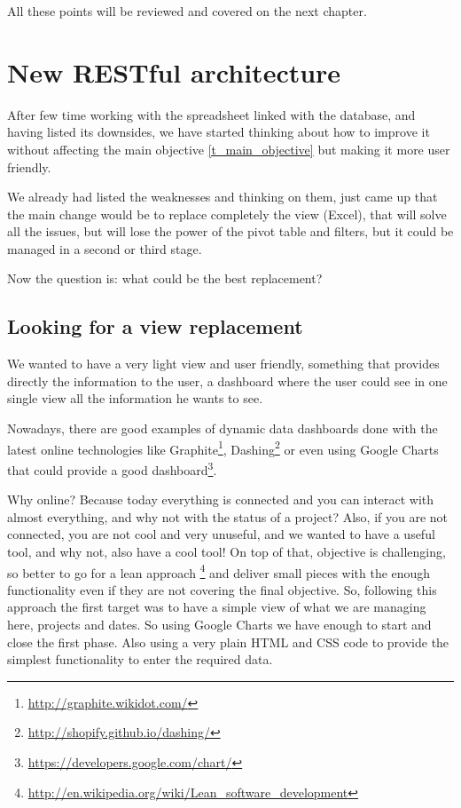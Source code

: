 All these points will be reviewed and covered on the next chapter. 

\chapter{New RESTful architecture}
After few time working with the spreadsheet linked with the database, and having
listed its downsides, we have started thinking about how to improve it without
affecting the main objective \ref{t_main_objective} but making it more
user friendly.

We already had listed the weaknesses and thinking on them, just came
up that the main change would be to replace completely the view (Excel), that
will solve all the issues, but will lose the power of the pivot table and
filters, but it could be managed in a second or third stage.

Now the question is: what could be the best replacement?

\section{Looking for a view replacement}
We wanted to have a very light view and user friendly, something that
provides directly the information to the user, a dashboard where the user could
see in one single view all the information he wants to see.

Nowadays, there are good examples of dynamic data dashboards done with the
latest online technologies like
Graphite\footnote{\url{http://graphite.wikidot.com/}},
Dashing\footnote{\url{http://shopify.github.io/dashing/}} or even using Google
Charts that could provide a good
dashboard\footnote{\url{https://developers.google.com/chart/}}.  

Why online? Because today everything is connected and you can interact with
almost everything, and why not with the status of a project? Also, if you are
not connected, you are not cool and very unuseful, and we wanted to have a
useful tool, and why not, also have a cool tool!  On top of that, objective is
challenging, so better to go for a lean approach
\footnote{\url{http://en.wikipedia.org/wiki/Lean\_software\_development}} and
deliver small pieces with the enough functionality even if they are not covering
the final objective. So, following this approach the first target was to have
a simple view of what we are managing here, projects and dates. So using Google
Charts we have enough to start and close the first phase. Also using a very
plain HTML and CSS code to provide the simplest functionality to enter the
required data.

